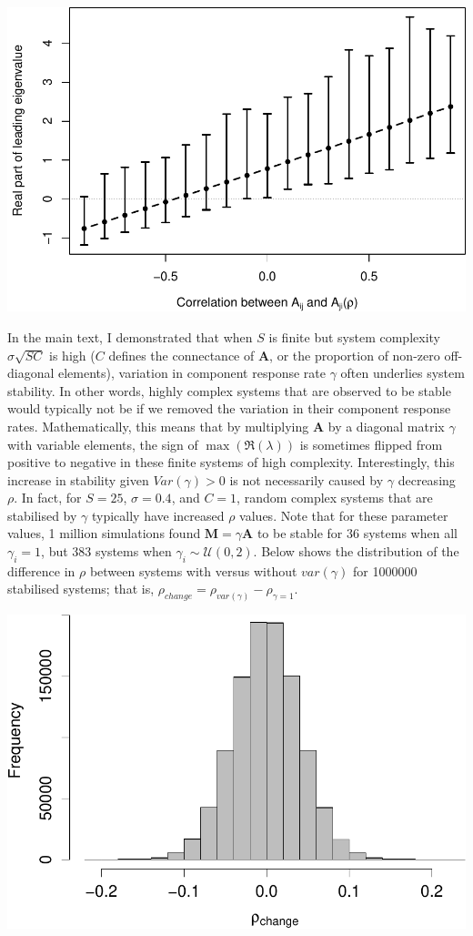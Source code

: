 \documentclass[]{article}
\begin{document}
\includegraphics{revision_notes_files/figure-latex/unnamed-chunk-7-1.pdf}

In the main text, I demonstrated that when \(S\) is finite but system
complexity \(\sigma\sqrt{SC}\) is high (\(C\) defines the connectance of
\(\textbf{A}\), or the proportion of non-zero off-diagonal elements),
variation in component response rate \(\gamma\) often underlies system
stability. In other words, highly complex systems that are observed to
be stable would typically not be if we removed the variation in their
component response rates. Mathematically, this means that by multiplying
\(\textbf{A}\) by a diagonal matrix \(\gamma\) with variable elements,
the sign of \(\max(\Re(\lambda))\) is sometimes flipped from positive to
negative in these finite systems of high complexity. Interestingly, this
increase in stability given \(Var(\gamma) > 0\) is not necessarily
caused by \(\gamma\) decreasing \(\rho\). In fact, for \(S = 25\),
\(\sigma = 0.4\), and \(C = 1\), random complex systems that are
stabilised by \(\gamma\) typically have increased \(\rho\) values. Note
that for these parameter values, 1 million simulations found
\(\textbf{M} = \gamma \textbf{A}\) to be stable for 36 systems when all
\(\gamma_{i} = 1\), but 383 systems when
\(\gamma_{i} \sim \mathcal{U}(0, 2)\). Below shows the distribution of
the difference in \(\rho\) between systems with versus without
\(var(\gamma)\) for 1000000 stabilised systems; that is,
\(\rho_{change} = \rho_{var(\gamma)} - \rho_{\gamma = 1}\).

\includegraphics{revision_notes_files/figure-latex/unnamed-chunk-10-1.pdf}
\end{document}

